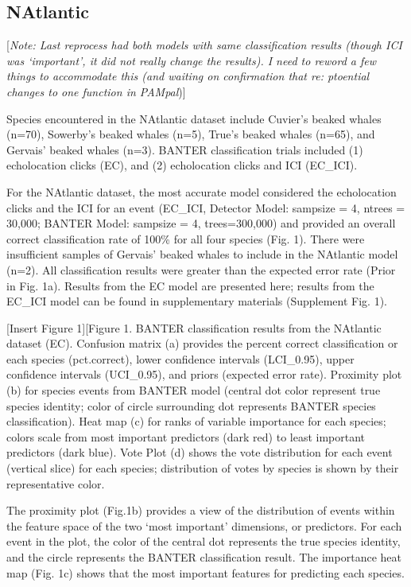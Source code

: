 \documentclass[
  authoryear,
  preprint,
  3p]{elsarticle}
\begin{document}
\hypertarget{natlantic}{%
\subsection{NAtlantic}\label{natlantic}}

{[}\emph{Note: Last reprocess had both models with same classification
results (though ICI was `important', it did not really change the
results). I need to reword a few things to accommodate this (and waiting
on confirmation that re: ptoential changes to one function in
PAMpal}){]}

Species encountered in the NAtlantic dataset include Cuvier's beaked
whales (n=70), Sowerby's beaked whales (n=5), True's beaked whales
(n=65), and Gervais' beaked whales (n=3). BANTER classification trials
included (1) echolocation clicks (EC), and (2) echolocation clicks and
ICI (EC\_ICI).

For the NAtlantic dataset, the most accurate model considered the
echolocation clicks and the ICI for an event (EC\_ICI, Detector Model:
sampsize = 4, ntrees = 30,000; BANTER Model: sampsize = 4,
trees=300,000) and provided an overall correct classification rate of
100\% for all four species (Fig. 1). There were insufficient samples of
Gervais' beaked whales to include in the NAtlantic model (n=2). All
classification results were greater than the expected error rate (Prior
in Fig. 1a). Results from the EC model are presented here; results from
the EC\_ICI model can be found in supplementary materials (Supplement
Fig. 1).

{[}Insert Figure 1{]}{[}Figure 1. BANTER classification results from the
NAtlantic dataset (EC). Confusion matrix (a) provides the percent
correct classification or each species (pct.correct), lower confidence
intervals (LCI\_0.95), upper confidence intervals (UCI\_0.95), and
priors (expected error rate). Proximity plot (b) for species events from
BANTER model (central dot color represent true species identity; color
of circle surrounding dot represents BANTER species classification).
Heat map (c) for ranks of variable importance for each species; colors
scale from most important predictors (dark red) to least important
predictors (dark blue). Vote Plot (d) shows the vote distribution for
each event (vertical slice) for each species; distribution of votes by
species is shown by their representative color.

The proximity plot (Fig.1b) provides a view of the distribution of
events within the feature space of the two `most important' dimensions,
or predictors. For each event in the plot, the color of the central dot
represents the true species identity, and the circle represents the
BANTER classification result. The importance heat map (Fig. 1c) shows
that the most important features for predicting each species.
\end{document}
